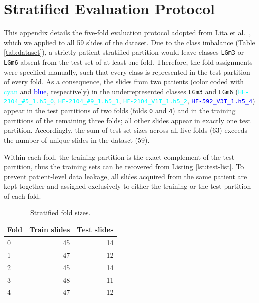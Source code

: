 \newpage
\section{Stratified Evaluation Protocol}
\label{app:cv_schema}
\setcounter{table}{0}
\renewcommand{\thetable}{\Alph{section}.\arabic{table}}

This appendix details the five-fold evaluation protocol adopted from Lita et al.~\cite{apollonov2024raman}, which we applied to all 59 slides of the dataset. Due to the class imbalance (Table \ref{tab:dataset}), a strictly patient-stratified partition would leave classes \texttt{LGm3} or \texttt{LGm6} absent from the test set of at least one fold. Therefore, the fold assignments were specified manually, such that every class is represented in the test partition of every fold. As a consequence, the slides from two patients (color coded with \textcolor{cyan}{cyan} and \textcolor{blue}{blue}, respectively) in the underrepresented classes \texttt{LGm3} and \texttt{LGm6} (\textcolor{cyan}{\texttt{HF-2104\_\#5\_1.h5\_0}}, \textcolor{cyan}{\texttt{HF-2104\_\#9\_1.h5\_1}}, \textcolor{cyan}{\texttt{HF-2104\_V1T\_1.h5\_2}}, \textcolor{blue}{\texttt{HF-592\_V3T\_1.h5\_4}}) appear in the test partitions of two folds (folds \texttt{0} and \texttt{4}) and in the training partitions of the remaining three folds; all other slides appear in exactly one test partition. Accordingly, the sum of test-set sizes across all five folds (63) exceeds the number of unique slides in the dataset (59).

Within each fold, the training partition is the exact complement of the test partition, thus the training sets can be recovered from Listing \ref{lst:test-list}. To prevent patient-level data leakage, all slides acquired from the same patient are kept together and assigned exclusively to either the training or the test partition of each fold.

\vspace*{1cm}

\begin{table}[H]
\centering
\begin{tabular}{lrr}
\toprule
Fold & Train slides & Test slides \\
\midrule
0 & 45 & 14 \\
1 & 47 & 12 \\
2 & 45 & 14 \\
3 & 48 & 11 \\
4 & 47 & 12 \\
\bottomrule
\end{tabular}
\caption{Stratified fold sizes.}
\label{tab:cv_folds_summary}
\end{table}


